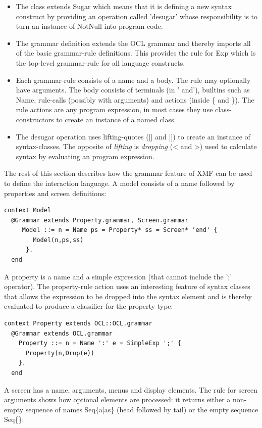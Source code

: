 \begin{itemize}
\item The class extends Sugar which means that it is defining a new syntax
construct by providing an operation called 'desugar' whose responsibility
is to turn an instance of NotNull into program code.
\item The grammar definition extends the OCL grammar and thereby imports
all of the basic grammar-rule definitions. This provides the rule
for Exp which is the top-level grammar-rule for all language constructs.
\item Each grammar-rule consists of a name and a body. The rule may optionally
have arguments. The body consists of terminals (in ' and'), builtins
such as Name, rule-calls (possibly with arguments) and actions (inside
\{ and \}). The rule actions are any program expression, in most cases
they use class-constructors to create an instance of a named class.
\item The desugar operation uses lifting-quotes ({[}| and |]) to create
an instance of syntax-classes. The opposite of \emph{lifting} is \emph{dropping}
(< and >) used to calculate syntax by evaluating an program expression.
\end{itemize}
The rest of this section describes how the grammar feature of XMF
can be used to define the interaction language. A model consists of
a name followed by properties and screen definitions:

\begin{lstlisting}
context Model
  @Grammar extends Property.grammar, Screen.grammar
     Model ::= n = Name ps = Property* ss = Screen* 'end' {
        Model(n,ps,ss)
      }.
  end
\end{lstlisting}A property is a name and a simple expression (that cannot include
the ';' operator). The property-rule action uses an interesting feature
of syntax classes that allows the expression to be dropped into the
syntax element and is thereby evaluated to produce a classifier for
the property type:

\begin{lstlisting}
context Property extends OCL::OCL.grammar
  @Grammar extends OCL.grammar
    Property ::= n = Name ':' e = SimpleExp ';' {
      Property(n,Drop(e))
    }.
  end
\end{lstlisting}A screen has a name, arguments, menus and display elements. The rule
for screen arguments shows how optional elements are processed: it
returns either a non-empty sequence of names Seq\{a|as\} (head followed
by tail) or the empty sequence Seq\{\}:

